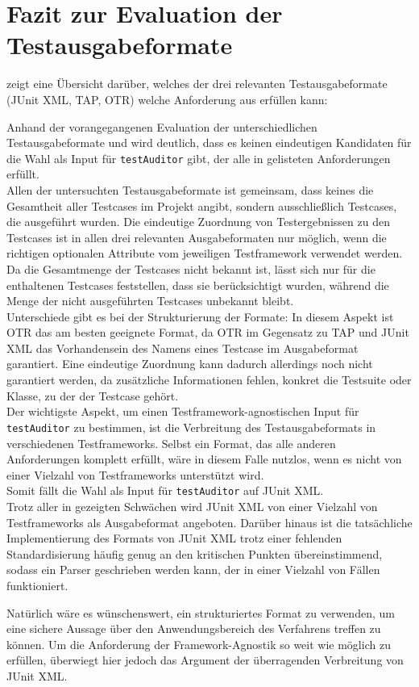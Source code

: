 \section{Fazit zur Evaluation der Testausgabeformate}\label{chap:conclusion_testformat_eval}
 zeigt eine Übersicht darüber, welches der drei relevanten Testausgabeformate (JUnit XML, TAP, OTR) welche Anforderung aus  erfüllen kann:

Anhand der vorangegangenen Evaluation der unterschiedlichen Testausgabeformate und  wird deutlich, dass es keinen eindeutigen Kandidaten für die Wahl als Input für \texttt{testAuditor} gibt, der alle in  gelisteten Anforderungen erfüllt.\\
Allen der untersuchten Testausgabeformate ist gemeinsam, dass keines die Gesamtheit aller Testcases im Projekt angibt, sondern ausschließlich Testcases, die ausgeführt wurden. Die eindeutige Zuordnung von Testergebnissen zu den Testcases ist in allen drei relevanten Ausgabeformaten nur möglich, wenn die richtigen optionalen Attribute vom jeweiligen Testframework verwendet werden. Da die Gesamtmenge der Testcases nicht bekannt ist, lässt sich nur für die enthaltenen Testcases feststellen, dass sie berücksichtigt wurden, während die Menge der nicht ausgeführten Testcases unbekannt bleibt.\\
Unterschiede gibt es bei der Strukturierung der Formate: In diesem Aspekt ist OTR das am besten geeignete Format, da OTR im Gegensatz zu TAP und JUnit XML das Vorhandensein des Namens eines Testcase im Ausgabeformat garantiert. Eine eindeutige Zuordnung kann dadurch allerdings noch nicht garantiert werden, da zusätzliche Informationen fehlen, konkret die Testsuite oder Klasse, zu der der Testcase gehört.\\
Der wichtigste Aspekt, um einen Testframework-agnostischen Input für \texttt{testAuditor} zu bestimmen, ist die Verbreitung des Testausgabeformats in verschiedenen Testframeworks. Selbst ein Format, das alle anderen Anforderungen komplett erfüllt, wäre in diesem Falle nutzlos, wenn es nicht von einer Vielzahl von Testframeworks unterstützt wird.\\
Somit fällt die Wahl als Input für \texttt{testAuditor} auf JUnit XML.\\
Trotz aller in  gezeigten Schwächen wird JUnit XML von einer Vielzahl von Testframeworks als Ausgabeformat angeboten. Darüber hinaus ist die tatsächliche Implementierung des Formats von JUnit XML trotz einer fehlenden Standardisierung häufig genug an den kritischen Punkten übereinstimmend, sodass ein Parser geschrieben werden kann, der in einer Vielzahl von Fällen funktioniert.

Natürlich wäre es wünschenswert, ein strukturiertes Format zu verwenden, um eine sichere Aussage über den Anwendungsbereich des Verfahrens treffen zu können. Um die Anforderung der Framework-Agnostik so weit wie möglich zu erfüllen, überwiegt hier jedoch das Argument der überragenden Verbreitung von JUnit XML.
